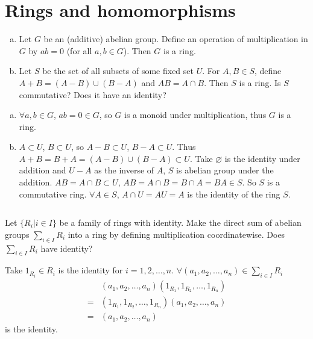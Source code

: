 \section{Rings and homomorphisms}
\begin{ex}
    \begin{enumerate}[(a)]
        \item Let $G$ be an (additive) abelian group. Define an operation of multiplication in $G$ by $ab=0$ (for all $a, b\in G$). Then $G$ is a ring.
        \item Let $S$ be the set of all subsets of some fixed set $U$. For $A, B\in S$, define $A+B=(A-B)\cup (B-A)$ and $AB=A\cap B$. Then $S$ is a ring. Is $S$ commutative? Does it have an identity?
    \end{enumerate}
\end{ex}

\begin{answer}
    \begin{enumerate}[(a)]
        \item $\forall a, b\in G$, $ab=0\in G$, so $G$ is a monoid under multiplication, thus $G$ is a ring.
        \item $A\subset U$, $B\subset U$, so $A-B\subset U$, $B-A\subset U$. Thus $A+B=B+A=(A-B)\cup (B-A)\subset U$. Take $\varnothing$ is the identity under addition and $U-A$ as the inverse of $A$, $S$ is abelian group under the addition. $AB=A\cap B\subset U$, $AB=A\cap B=B\cap A=BA\in S$. So $S$ is a commutative ring. $\forall A\in S$, $A\cap U=AU=A$ is the identity of the ring $S$.
    \end{enumerate}
\end{answer}

$$ $$

\begin{ex}
    Let $\{R_{i}|i\in I\}$ be a family of rings with identity. Make the direct sum of abelian groups $\sum\limits_{i\in I}R_{i}$ into a ring by defining multiplication coordinatewise. Does $\sum\limits_{i\in I}R_{i}$ have identity?
\end{ex}

\begin{answer}
    Take $1_{R_{i}}\in R_{i}$ is the identity for $i=1,2,\dots, n$. $\forall (a_{1}, a_{2}, \dots, a_{n})\in \sum\limits_{i\in I}R_{i}$ \[\begin{aligned}
        &(a_{1}, a_{2},\dots, a_{n})(1_{R_{1}}, 1_{R_{2}},\dots, 1_{R_{n}})\\ =&(1_{R_{1}}, 1_{R_{2}},\dots, 1_{R_{n}})(a_{1}, a_{2},\dots, a_{n})\\ =&(a_{1}, a_{2},\dots, a_{n})
    \end{aligned}\] is the identity.
\end{answer}

